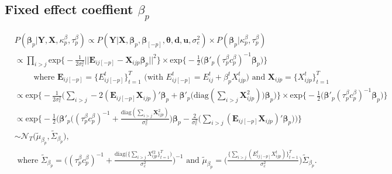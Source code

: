 \documentclass[a4paper]{article}
\begin{document}
\subsection{Fixed effect coeffient $\beta_p$} 
			\begin{equation}
			\begin{aligned}
			&P(\boldsymbol{\beta}_p|\mathbf{Y}, \mathbf{X}, \kappa^\beta_p, \tau^\beta_p) \propto P(\mathbf{Y}|\mathbf{X}, \boldsymbol{\beta}_p, \boldsymbol{\beta}_{[-p]}, \boldsymbol{\theta}, \boldsymbol{d}, \boldsymbol{u},\sigma_e^2) \times P(\boldsymbol{\beta}_p|\kappa^\beta_p, \tau^\beta_p) \\
			&\propto\prod\limits_{i>j}\mbox{exp}\Big\{-\frac{1}{2\sigma_e^2}||\mathbf{E}_{ij[-p]}-\mathbf{X}_{ijp}\boldsymbol{\beta}_p||^2\Big\}\times \mbox{exp}\Big\{-\frac{1}{2}\big(\boldsymbol{\beta}'_p(\tau^{\beta}_pc^\beta_p)^{-1}\boldsymbol{\beta}_p\big)\Big\} \\ &\quad\quad\mbox{ where } \mathbf{E}_{ij[-p]} = \{E^t_{ij[-p]}\}_{t=1}^T \mbox{ (with }E^{t}_{ij[-p]}=E^t_{ij}+\beta^t_{p}X^{t}_{ijp})\mbox{ and } \mathbf{X}_{ijp} = \{X^t_{ijp}\}_{t=1}^T\\
			&\propto\mbox{exp}\Big\{-\frac{1}{2\sigma_e^2}\Big(\sum\limits_{i>j}-2(\mathbf{E}_{ij[-p]}\mathbf{X}_{ijp})'\boldsymbol{\beta}_p+\boldsymbol{\beta}'_p\big(\mbox{diag}(\sum\limits_{i>j}{\mathbf{X}^2_{ijp}})\big)\boldsymbol{\beta}_p\Big)\Big\}\times \mbox{exp}\Big\{-\frac{1}{2}\big(\boldsymbol{\beta}'_p(\tau^{\beta}_pc^\beta_p)^{-1}\boldsymbol{\beta}_p\big)\Big\}\\
			&\propto\mbox{exp}\Big\{-\frac{1}{2}\Big(\boldsymbol{\beta}'_p\big((\tau^{\beta}_pc^\beta_p)^{-1}+\frac{\mbox{diag}(\sum_{i>j}{\mathbf{X}^2_{ijp}})}{\sigma_e^2}\big)\boldsymbol{\beta}_p-\frac{2}{\sigma_e^2}\big(\sum_{i>j}(\mathbf{E}_{ij[-p]}\mathbf{X}_{ijp})'\boldsymbol{\beta}_p\big)\Big)\Big\}\\
			& \sim \mathcal{N}_T\big(\tilde{\mu}_{\beta_p}, \tilde{\Sigma}_{\beta_p} \big),\\
		&\mbox{ where } \tilde{\Sigma}_{\beta_p} = \Big((\tau^{\beta}_pc^\beta_p)^{-1}+\frac{\mbox{diag}\big(\{\sum_{i>j}{X^{t2}_{ijp}}\}_{t=1}^{T}\big)}{\sigma_e^2}\Big)^{-1} \mbox{ and } \tilde{\mu}_{\beta_p} =  \Big(\frac{\{\sum_{i>j}(E^{t}_{ij[-p]}X^t_{ijp})\}_{t=1}^{T}}{\sigma_e^2}\Big)\tilde{\Sigma}_{\beta_p}.
			\end{aligned}
			\end{equation} 
\end{document}
